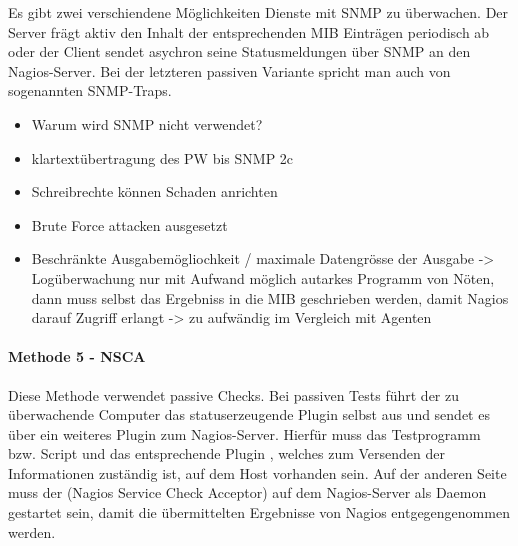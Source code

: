 Es gibt zwei verschiendene Möglichkeiten Dienste mit \gls{SNMP} zu überwachen.
Der Server frägt aktiv den Inhalt der entsprechenden \gls{MIB} Einträgen periodisch ab oder der Client sendet asychron seine Statusmeldungen über \gls{SNMP} an den Nagios-Server.
Bei der letzteren passiven Variante spricht man auch von sogenannten \gls{SNMP}-Traps.


\begin{itemize}
\item Warum wird SNMP nicht verwendet?
\item klartextübertragung des PW bis SNMP 2c
\item Schreibrechte können Schaden anrichten
\item Brute Force attacken ausgesetzt
\item Beschränkte Ausgabemögliochkeit / maximale Datengrösse der Ausgabe -> Logüberwachung nur mit Aufwand möglich autarkes Programm von Nöten, dann muss selbst das Ergebniss in die MIB geschrieben werden, damit Nagios darauf Zugriff erlangt -> zu aufwändig im Vergleich mit Agenten
\end{itemize}




\paragraph{Methode 5 - NSCA}
Diese Methode verwendet passive Checks.
Bei passiven Tests führt der zu überwachende Computer das statuserzeugende Plugin selbst aus und sendet es über ein weiteres Plugin zum Nagios-Server.
Hierfür muss das Testprogramm bzw. Script und das entsprechende Plugin , welches zum Versenden der Informationen zuständig ist, auf dem Host vorhanden sein.
Auf der anderen Seite muss der  (Nagios Service Check Acceptor) auf dem Nagios-Server als Daemon gestartet sein, damit die übermittelten Ergebnisse von Nagios entgegengenommen werden.

